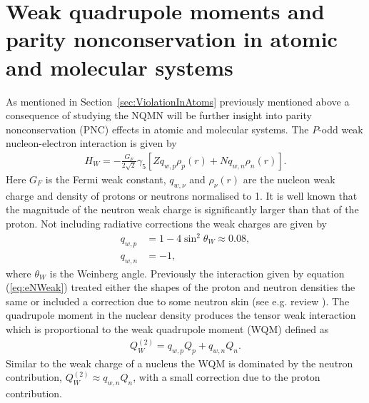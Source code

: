 \documentclass[10pt,a4paper, twoside, openright]{report}
\begin{document}
\section{Weak quadrupole moments and parity nonconservation in atomic and molecular systems\label{sec:PNC}} 
As mentioned in Section~\ref{sec:ViolationInAtoms} previously mentioned above a consequence of studying the NQMN will be further insight into parity nonconservation (PNC) effects in atomic and molecular systems. The $P$-odd weak nucleon-electron interaction is given by
\begin{align} \label{eq:eNWeak}
H_W = -\frac{G_F}{2\sqrt{2}}\gamma_{5}\left[Zq_{w, p}\rho_{p}(r) + Nq_{w, n}\rho_{n}(r)\right].
\end{align}
Here $G_F$ is the Fermi weak constant, $q_{w,\nu}$ and $\rho_{\nu}(r)$ are the nucleon weak charge  and density of protons or neutrons  normalised to 1. It is well known that the magnitude of the neutron weak charge is significantly larger than that of the proton. Not including radiative corrections the weak charges  are given by 
\begin{align*}
q_{w,p} &= 1 - 4\sin^2\theta_W \approx 0.08 ,\\
q_{w,n} &= -1,
\end{align*}
where $\theta_W$ is the Weinberg angle.  Previously the interaction given by equation (\ref{eq:eNWeak}) treated either the shapes of the proton and neutron densities  the same  or included a correction due to some neutron skin (see e.g. review \cite{Roberts2015}).  The quadrupole moment in the nuclear density produces the tensor weak interaction which is proportional to the weak quadrupole moment (WQM) defined as  \cite{FDC17}
\begin{align*}
Q_{W}^{(2)} = q_{w,p}Q_{p} + q_{w,n}Q_n.
\end{align*}
Similar to the weak charge of a nucleus the WQM is dominated by the neutron contribution,  $Q_{W}^{(2)} \approx q_{w,n}Q_n$,  with a small correction due to the proton contribution. \\
\end{document}
